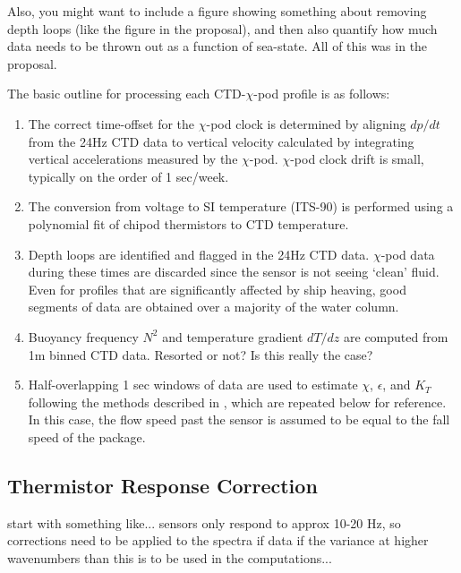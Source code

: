 \documentclass{ametsoc}
\begin{document}
Also, you might want to include a figure showing something about removing depth loops (like the figure in the proposal), and then also quantify how much data needs to be thrown out as a function of sea-state.  All of this was in the proposal.    

The basic outline for processing each CTD-$\chi$-pod profile is as follows:
\begin{enumerate}
\item The correct time-offset for the $\chi$-pod clock is determined by aligning $dp/dt$ from the 24Hz CTD data to vertical velocity calculated by integrating vertical accelerations measured by the $\chi$-pod. $\chi$-pod clock drift is small, typically on the order of 1 sec/week.
\item The conversion from voltage to SI temperature (ITS-90) is performed using a polynomial fit of chipod thermistors to CTD temperature. 
\item Depth loops are identified and flagged in the 24Hz CTD data. $\chi$-pod data during these times are discarded since the sensor is not seeing `clean' fluid. Even for profiles that are significantly affected by ship heaving, good segments of data are obtained over a majority of the water column.
\item Buoyancy frequency $N^2$ and temperature gradient $dT/dz$ are computed from 1m binned CTD data.  Resorted or not? Is this really the case?  
\item Half-overlapping 1 sec windows of data are used to estimate $\chi$, $\epsilon$, and $K_T$ following the methods described in \cite{moumnash09}, which are repeated below for reference. In this case, the flow speed past the sensor is assumed to be equal to the fall speed of the package.
\end{enumerate}


\subsection{Thermistor Response Correction}

start with something like... sensors only respond to approx 10-20 Hz, so corrections need to be applied to the spectra if data if the variance at higher wavenumbers than this is to be used in the computations...
\end{document}
